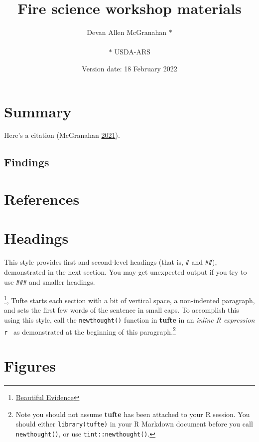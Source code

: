 \documentclass[]{tufte-book}
\title{Fire science workshop materials}
\author{Devan Allen McGranahan \(*\)\\
~\\
\(*\) USDA-ARS\\}
\date{Version date: 18 February 2022}
\begin{document}
\maketitle




\hypertarget{summary}{%
\chapter{Summary}\label{summary}}

Here's a citation (McGranahan
\protect\hyperlink{ref-mcgranahan2021}{2021}).

\hypertarget{findings}{%
\section{Findings}\label{findings}}

\hypertarget{references}{%
\chapter{References}\label{references}}

\hypertarget{headings}{%
\chapter{Headings}\label{headings}}

This style provides first and second-level headings (that is,
\texttt{\#} and \texttt{\#\#}), demonstrated in the next section. You
may get unexpected output if you try to use \texttt{\#\#\#} and smaller
headings.

\footnote{\href{https://www.edwardtufte.com/tufte/books_be}{Beautiful
  Evidence}}, Tufte starts each section with a bit of vertical space, a
non-indented paragraph, and sets the first few words of the sentence in
small caps. To accomplish this using this style, call the
\texttt{newthought()} function in \textbf{tufte} in an \emph{inline R
expression} \texttt{\textasciigrave{}r\ \textasciigrave{}} as
demonstrated at the beginning of this paragraph.\footnote{Note you
  should not assume \textbf{tufte} has been attached to your R session.
  You should either \texttt{library(tufte)} in your R Markdown document
  before you call \texttt{newthought()}, or use
  \texttt{tint::newthought()}.}

\hypertarget{figures}{%
\chapter{Figures}\label{figures}}
\end{document}
